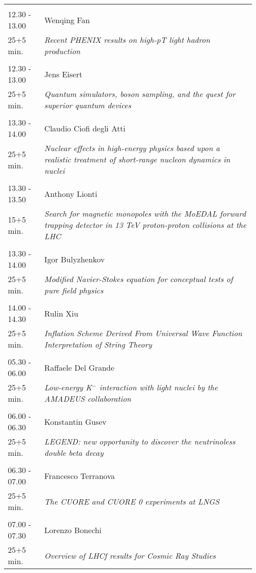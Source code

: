 \begin{longtable}{p{3cm}p{13cm}}
 & \\ 
12.30 - 13.00 & Wenqing Fan\\ 
25+5 min. & {\it Recent PHENIX results on high-pT light hadron production}\\ 
 & \\ 
12.30 - 13.00 & Jens Eisert\\ 
25+5 min. & {\it Quantum simulators, boson sampling, and the quest for superior quantum devices}\\ 
 & \\ 
13.30 - 14.00 & Claudio Ciofi degli Atti\\ 
25+5 min. & {\it Nuclear effects in high-energy physics based upon a realistic treatment of short-range nucleon dynamics in nuclei}\\ 
 & \\ 
13.30 - 13.50 & Anthony Lionti\\ 
15+5 min. & {\it Search for magnetic monopoles with the MoEDAL forward trapping detector in 13 TeV proton-proton collisions at the LHC}\\ 
 & \\ 
13.30 - 14.00 & Igor Bulyzhenkov\\ 
25+5 min. & {\it Modified Navier-Stokes equation for conceptual tests of pure field physics}\\ 
 & \\ 
14.00 - 14.30 & Rulin Xiu\\ 
25+5 min. & {\it Inflation Scheme Derived From Universal Wave Function Interpretation of String Theory}\\ 
 & \\ 
05.30 - 06.00 & Raffaele Del Grande\\ 
25+5 min. & {\it Low-energy K$^-$ interaction with light nuclei by the AMADEUS collaboration}\\ 
 & \\ 
06.00 - 06.30 & Konstantin Gusev\\ 
25+5 min. & {\it LEGEND: new opportunity to discover the neutrinoless double beta decay}\\ 
 & \\ 
06.30 - 07.00 & Francesco Terranova\\ 
25+5 min. & {\it The CUORE and CUORE 0 experiments at LNGS}\\ 
 & \\ 
07.00 - 07.30 & Lorenzo Bonechi\\ 
25+5 min. & {\it Overview of LHCf results for Cosmic Ray Studies}\\ 

\end{longtable}
